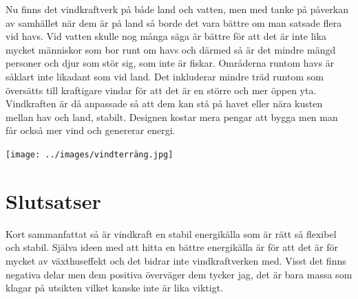 \documentclass[11p]{article}
\begin{document}
    Nu finns det vindkraftverk på både land och vatten, men med tanke på påverkan av samhället när dem är på land så borde det vara bättre om man satsade flera vid havs.
    Vid vatten skulle nog många säga är bättre för att det är inte lika mycket människor som bor runt om havs och därmed så är det mindre mängd personer och djur som stör sig, som inte är fiskar.
    Områderna runtom havs är såklart inte likadant som vid land.
    Det inkluderar mindre träd runtom som översätts till kraftigare vindar för att det är en större och mer öppen yta.
    Vindkraften är då anpassade så att dem kan stå på havet eller nära kusten mellan hav och land, stabilt.
    Designen kostar mera pengar att bygga men man får också mer vind och genererar energi.


    \texttt{[image: ../images/vindterräng.jpg]}



    \section{Slutsatser}
  Kort sammanfattat så är vindkraft en stabil energikälla som är rätt så flexibel och stabil.
    Själva ideen med att hitta en bättre energikälla är för att det är för mycket av växthuseffekt och det bidrar inte vindkraftverken med.
    Visst det finns negativa delar men dem positiva överväger dem tycker jag, det är bara massa som klagar på utsikten vilket kanske inte är lika viktigt.
\end{document}
